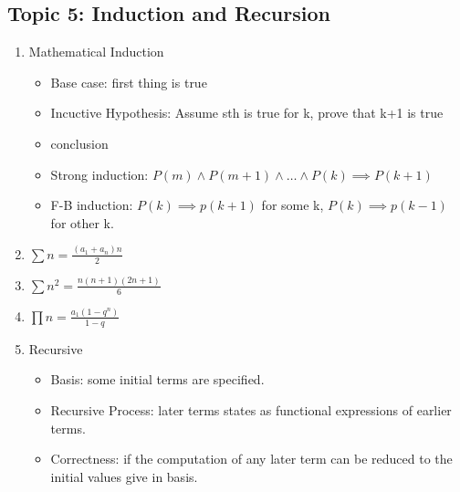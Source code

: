 \documentclass[11pt, a4paper]{article}
\begin{document}
\begin{multicols}{3}
\section*{Topic 5: Induction and Recursion}
    \begin{enumerate}
        \item Mathematical Induction
            \begin{itemize}
                \item Base case: first thing is true
                \item Incuctive Hypothesis: Assume sth is true for k, prove that k+1 is true
                \item conclusion
                \item Strong induction: $P(m) \land P(m+1) \land \dots \land P(k) \implies P(k+1)$
                \item F-B induction: $P(k) \implies p(k+1)$ for some k,  $P(k) \implies p(k-1)$ for other k.
            \end{itemize}
        \item $\sum{n} = \frac {(a_1 + a_n)n}{2}$
        \item $\sum{n^2} = \frac{n(n+1)(2n+1)}{6}$
        \item $\prod{n} = \frac {a_1(1-q^n)}{1-q}$
        \item Recursive
            \begin{itemize}
                \item Basis: some initial terms are specified.
                \item Recursive Process: later terms states as functional expressions of earlier terms.
                \item Correctness: if the computation of any later term can be reduced to the initial values give in basis.
            \end{itemize}
    \end{enumerate}


\end{multicols}
\end{document}
